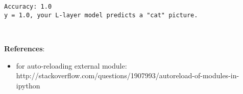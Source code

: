 \documentclass[11pt]{article}
\providecommand{\tightlist}{%
      \setlength{\itemsep}{0pt}\setlength{\parskip}{0pt}}
\begin{document}
    \begin{Verbatim}[commandchars=\\\{\}]
Accuracy: 1.0
y = 1.0, your L-layer model predicts a "cat" picture.
    \end{Verbatim}

    \begin{center}
    \end{center}
    { \hspace*{\fill} \\}
    
    \textbf{References}:

\begin{itemize}
\tightlist
\item
  for auto-reloading external module:
  http://stackoverflow.com/questions/1907993/autoreload-of-modules-in-ipython
\end{itemize}


    
    
    
\end{document}
